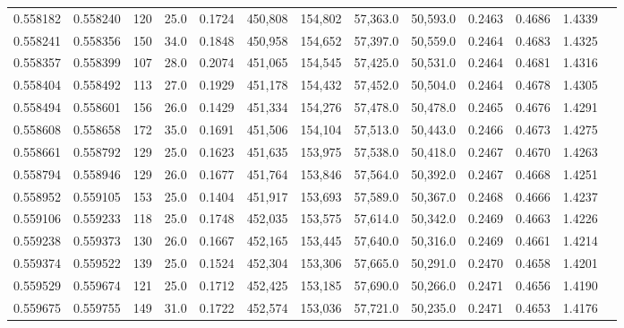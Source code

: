 \begin{tabular}{rrrrrrrrrrrrr}
0.558182 & 0.558240 &   120 & 25.0 &                                     0.1724 & 450,808 & 154,802 &  57,363.0 &  50,593.0 & 0.2463 & 0.4686 & 1.4339 \\
0.558241 & 0.558356 &   150 & 34.0 &                                     0.1848 & 450,958 & 154,652 &  57,397.0 &  50,559.0 & 0.2464 & 0.4683 & 1.4325 \\
0.558357 & 0.558399 &   107 & 28.0 &                                     0.2074 & 451,065 & 154,545 &  57,425.0 &  50,531.0 & 0.2464 & 0.4681 & 1.4316 \\
0.558404 & 0.558492 &   113 & 27.0 &                                     0.1929 & 451,178 & 154,432 &  57,452.0 &  50,504.0 & 0.2464 & 0.4678 & 1.4305 \\
0.558494 & 0.558601 &   156 & 26.0 &                                     0.1429 & 451,334 & 154,276 &  57,478.0 &  50,478.0 & 0.2465 & 0.4676 & 1.4291 \\
0.558608 & 0.558658 &   172 & 35.0 &                                     0.1691 & 451,506 & 154,104 &  57,513.0 &  50,443.0 & 0.2466 & 0.4673 & 1.4275 \\
0.558661 & 0.558792 &   129 & 25.0 &                                     0.1623 & 451,635 & 153,975 &  57,538.0 &  50,418.0 & 0.2467 & 0.4670 & 1.4263 \\
0.558794 & 0.558946 &   129 & 26.0 &                                     0.1677 & 451,764 & 153,846 &  57,564.0 &  50,392.0 & 0.2467 & 0.4668 & 1.4251 \\
0.558952 & 0.559105 &   153 & 25.0 &                                     0.1404 & 451,917 & 153,693 &  57,589.0 &  50,367.0 & 0.2468 & 0.4666 & 1.4237 \\
0.559106 & 0.559233 &   118 & 25.0 &                                     0.1748 & 452,035 & 153,575 &  57,614.0 &  50,342.0 & 0.2469 & 0.4663 & 1.4226 \\
0.559238 & 0.559373 &   130 & 26.0 &                                     0.1667 & 452,165 & 153,445 &  57,640.0 &  50,316.0 & 0.2469 & 0.4661 & 1.4214 \\
0.559374 & 0.559522 &   139 & 25.0 &                                     0.1524 & 452,304 & 153,306 &  57,665.0 &  50,291.0 & 0.2470 & 0.4658 & 1.4201 \\
0.559529 & 0.559674 &   121 & 25.0 &                                     0.1712 & 452,425 & 153,185 &  57,690.0 &  50,266.0 & 0.2471 & 0.4656 & 1.4190 \\
0.559675 & 0.559755 &   149 & 31.0 &                                     0.1722 & 452,574 & 153,036 &  57,721.0 &  50,235.0 & 0.2471 & 0.4653 & 1.4176 \\

\end{tabular}
